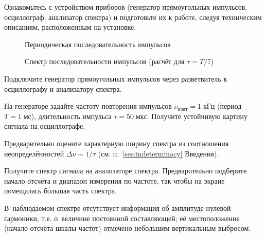\begin{lab:task}

\taskpreamble{~}
\vspace*{-8ex} %



\item Ознакомьтесь с устройством приборов (генератор прямоугольных импульсов,
осциллограф, анализатор спектра) и подготовьте их к работе,
следуя техническим описаниям, расположенным на установке.

\begin{figure}[h!]
    \hfil\hfil
    \begin{minipage}{0.45\textwidth}
        \caption{Периодическая последовательность импульсов}
    \end{minipage}
    \hfil
    \begin{minipage}{0.45\textwidth}
        \caption{Спектр последовательности импульсов 
            (расчёт для $\tau=T/7$)}
    \end{minipage}
\end{figure}

\item Подключите генератор прямоугольных импульсов через разветвитель
к осциллографу и анализатору спектра.

\item На генераторе задайте частоту повторения импульсов
$\nu_{повт} = 1\;кГц$ (период $T=1\;мс$), длительность импульса
$\tau=50\;мкс$. Получите устойчивую картину сигнала на осциллографе.

\item Предварительно оцените характерную ширину спектра
из соотношения неопределённостей $\Delta \nu \sim 1/\tau$
(см.  п.~\ref{sec:indeterminacy} Введения).

\item Получите спектр сигнала на анализаторе спектра. Предварительно
подберите начало отсчёта и диапазон измерения по частоте,
так чтобы на экране помещалась б\'{о}льшая часть спектра.

В~наблюдаемом спектре отсутствует информация об амплитуде нулевой гармоники,
т.е. о~величине постоянной составляющей; её местоположение (начало отсчёта шкалы
частот) отмечено небольшим вертикальным выбросом.


\end{lab:task}
